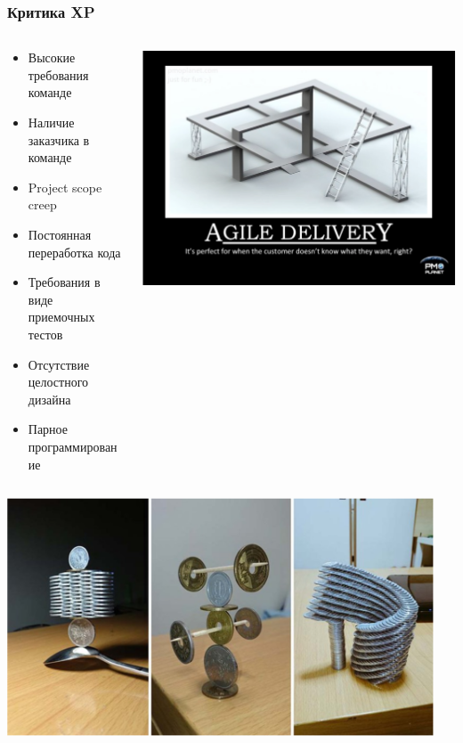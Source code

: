 \documentclass{../../slides-style}
\begin{document}
    \begin{frame}
        \frametitle{Критика XP}
        \begin{columns}
            \begin{column}{0.7\textwidth}
                \begin{itemize}
                    \item Высокие требования команде
                    \item Наличие заказчика в команде
                    \item Project scope creep
                    \item Постоянная переработка кода
                    \item Требования в виде приемочных тестов
                    \item Отсутствие целостного дизайна
                    \item Парное программирование
                \end{itemize}
            \end{column}
            \begin{column}{0.3\textwidth}
                \begin{center}
                    \includegraphics[width=\textwidth]{agileDelivery.png}
                \end{center}
            \end{column}
        \end{columns}
    \end{frame}

    \begin{frame}
        \begin{center}
            \includegraphics[width=0.95\textwidth]{agileMoney.png}
        \end{center}
    \end{frame}
\end{document}
